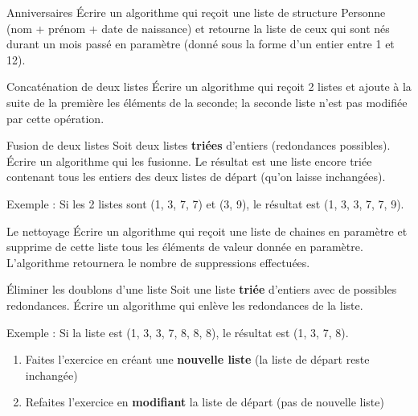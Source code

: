 		\begin{Exercice}{Anniversaires}
				Écrire un algorithme qui reçoit une liste de structure Personne 
				(nom + prénom + date de naissance) et retourne la liste
				de ceux qui sont nés durant un mois passé en paramètre 
				(donné sous la forme d'un entier entre 1 et 12).
		\end{Exercice}
			
		\begin{Exercice}{Concaténation de deux listes}
				Écrire un algorithme qui reçoit 2 listes et ajoute
				à la suite de la première les éléments de la seconde; la seconde liste
				n'est pas modifiée par cette opération.
		\end{Exercice}
		
		\begin{Exercice}{Fusion de deux listes}
				Soit deux listes \textbf{triées}
				d'entiers (redondances possibles). Écrire un algorithme
				qui les fusionne. Le résultat est une liste encore triée contenant
				tous les entiers des deux listes de départ (qu'on
				laisse inchangées).
		
				Exemple : Si les 2 listes sont (1, 3, 7, 7) et (3, 9), 
				le résultat est (1, 3, 3, 7, 7, 9).
		\end{Exercice}
		
		\begin{Exercice}{Le nettoyage}
			Écrire un algorithme qui reçoit une liste de chaines en paramètre et
			supprime de cette liste tous les éléments de valeur donnée en
			paramètre. L'algorithme retournera le nombre de
			suppressions effectuées.
		\end{Exercice}
		
		\begin{Exercice}{Éliminer les doublons d'une liste}
				Soit une liste \textbf{triée} 
				d'entiers avec de possibles redondances. Écrire un
				algorithme qui enlève les redondances de la liste.
						
				Exemple : Si la liste est (1, 3, 3, 7, 8, 8, 8),
				le résultat est (1, 3, 7, 8).
		
				\begin{enumerate}[label=\alph*)]
					\item 
						Faites l'exercice en créant une \textbf{nouvelle
						liste} (la liste de départ reste inchangée)
					\item 
						Refaites l'exercice en \textbf{modifiant}
						la liste de départ (pas de nouvelle liste)
				\end{enumerate}
		\end{Exercice}
				
